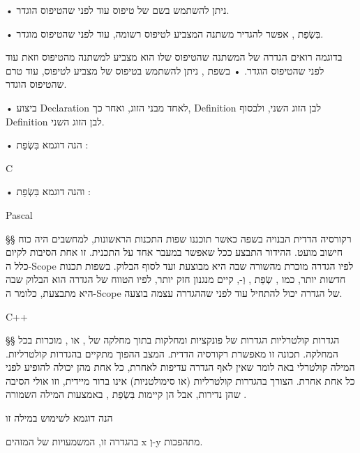 \begin{enumerate}
• ניתן להשתמש בשם של טיפוס עוד לפני שהטיפוס הוגדר.
\begin{itemize}
• בִּשְׂפַת , אפשר להגדיר משתנה המצביע לטיפוס רשומה, עוד לפני שהטיפוס מוגדר.



 בדוגמה רואים הגדרה של המשתנה  שהטיפוס שלו הוא מצביע למשתנה מהטיפוס  וזאת עוד לפני שהטיפוס  הוגדר.
• בשפת , ניתן להשתמש בטיפוס של מצביע לטיפוס, עוד טרם שהטיפוס הוגדר.
\end{itemize}
• ביצוע Declaration לאחד מבני הזוג, ואחר כך, Definition לבן הזוג השני, ולבסוף Definition לבן הזוג השני.
\begin{itemize}
• הנה דוגמא בִּשְׂפַת :

{C}

• והנה דוגמא בִּשְׂפַת :

{Pascal}

\end{itemize}
\end{enumerate}

§§ רקורסיה הדדית הבנויה בשפה
כאשר תוכננו שפות התכנות הראשונות, למחשבים היה כוח חישוב מועט. ההידור התבצע ככל
שאפשר במעבר אחד על התכנית. זו אחת הסיבות לקיום כלל ה-Scope לפיו הגדרה מוכרת
מהשורה שבה היא מבוצעת ועד לסוף הבלוק. בשפות תכנות חדשות יותר, כמו , שְׂפַת
, וְ-, קיים מנגנון חזק יותר, לפיו הטווח של הגדרה הוא הבלוק שבה
היא מתבצעת, כלומר ה-Scope של הגדרה יכול להתחיל עוד לפני שההגדרה עצמה בוצעה.

{C++}

§§ הגדרות קולטרליות
הגדרות של פונקציות ומחלקות בתוך מחלקה של , או , מוכרות בכל המחלקה.
תכונה זו מאפשרת רקורסיה הדדית. המצב ההפוך מתקיים בהגדרות קולטרליות. המילה
קולטרלי באה לומר שאין לאף הגדרה עדיפות לאחרת, כל אחת מהן יכולה להופיע לפני כל
אחת אחרת. הצורך בהגדרות קולטרליות (או סימולטניות) אינו ברור מיידית, וזו אולי
הסיבה שהן נדירות, אבל הן קיימות בִּשְׂפַת , באמצעות המילה השמורה .

הנה דוגמא לשימוש במילה זו
\begin{center}
\end{center}

בהגדרה זו, המשמעויות של המזהים x וְ-y מתהפכות.

